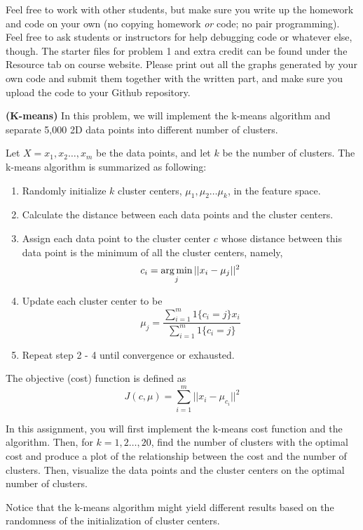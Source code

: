 \documentclass[12pt,letterpaper,fleqn]{hmcpset}
\begin{document}
Feel free to work with other students, but make sure you write up the homework
and code on your own (no copying homework \textit{or} code; no pair programming).
Feel free to ask students or instructors for help debugging code or whatever else,
though.
\newline
\newline
The starter files for problem 1 and extra credit can be found under the Resource tab on course website. Please print out all the graphs generated by your own code and submit them together with the written part, and make sure you upload the code to your Github repository.



\begin{problem}[1]
\textbf{(K-means)} In this problem, we will implement the k-means algorithm and separate 5,000 2D data points into different number of clusters.
\newline
\par Let $X = {x_1, x_2 \ldots, x_m} $ be the data points, and let $k$ be the number of clusters. The k-means algorithm is summarized as following:
\begin{enumerate}[1.]
\item Randomly initialize $k$ cluster centers, $\mu_1, \mu_2 \ldots \mu_k$, in the feature space.
\item Calculate the distance between each data points and the cluster centers.
\item Assign each data point to the cluster center $c$ whose distance between this data point is the minimum of all the cluster centers, namely, \[
c_i = \operatorname*{arg\,min}_j ||x_i - \mu_j||^2
\]
\item Update each cluster center to be\[
\mu_j = \frac{\sum_{i=1}^{m}1\{c_i = j\}x_i}{\sum_{i = 1}^{m}1\{c_i = j\}}
\]
\item Repeat step 2 - 4 until convergence or exhausted.
\end{enumerate}
\par 
The objective (cost) function is defined as \[
J(c, \mu) = \sum_{i = 1}^{m}||x_i - \mu_{c_i}||^2
\]

\par In this assignment, you will first implement the k-means cost function and the algorithm. Then, for $k = 1, 2 \ldots, 20$, find the number of clusters with the optimal cost and produce a plot of the relationship between the cost and the number of clusters. Then, visualize the data points and the cluster centers on the optimal number of clusters.
\newline 
\par Notice that the k-means algorithm might yield different results based on the randomness of the initialization of cluster centers.
\end{problem}
\end{document}
